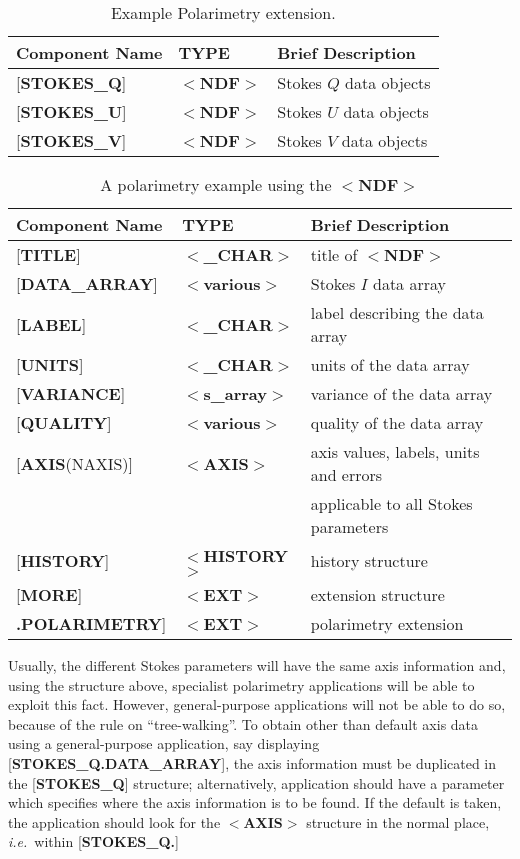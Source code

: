 \documentclass[twoside,11pt,nolof,noabs]{starlink}
\begin{document}
\begin{table}
\centering
\caption{Example Polarimetry extension.}
\begin{tabular}{|l|l|l|}
\hline
Component Name & TYPE & Brief Description \\ \hline
{[}\textbf{STOKES\_Q}{]} & $<$\textbf{NDF}$>$ & Stokes $Q$ data objects \\
{[}\textbf{STOKES\_U}{]} & $<$\textbf{NDF}$>$ & Stokes $U$ data objects \\
{[}\textbf{STOKES\_V}{]} & $<$\textbf{NDF}$>$ & Stokes $V$ data objects \\ \hline
\end{tabular}
\end{table}

\begin{table}
\centering
\caption{A polarimetry example using the $<$\textbf{NDF}$>$}
\begin{tabular}{|l|l|l|}
\hline
Component Name & TYPE & Brief Description \\ \hline
{[}\textbf{TITLE}{]} & $<$\textbf{\_CHAR}$>$ & title of $<$\textbf{NDF}$>$ \\
{[}\textbf{DATA\_ARRAY}{]} & $<$\textbf{various}$>$ & Stokes $I$ data array \\
{[}\textbf{LABEL}{]} & $<$\textbf{\_CHAR}$>$ & label describing the data array \\
{[}\textbf{UNITS}{]} & $<$\textbf{\_CHAR}$>$ & units of the data array \\
{[}\textbf{VARIANCE}{]} & $<$\textbf{s\_array}$>$ & variance of the data array \\
{[}\textbf{QUALITY}{]} & $<$\textbf{various}$>$ & quality of the data array \\
{[}\textbf{AXIS}(NAXIS){]} & $<$\textbf{AXIS}$>$ & axis values, labels, units and errors\\
& & applicable to all Stokes parameters \\
{[}\textbf{HISTORY}{]} & $<$\textbf{HISTORY}$>$ & history structure \\
{[}\textbf{MORE}{]} & $<$\textbf{EXT}$>$ & extension structure \\
\hspace{14mm}{[}\textbf{.POLARIMETRY}{]} & $<$\textbf{EXT}$>$ & polarimetry extension \\ \hline
\end{tabular}
\end{table}

Usually, the different Stokes parameters will
have the same axis information and,
using the structure above, specialist polarimetry applications will
be able to exploit this fact.  However, general-purpose applications will
not be able to do so,
because of the rule on ``tree-walking''.  To obtain
other than default
axis data using a general-purpose application, say displaying
{[}\textbf{STOKES\_Q.DATA\_ARRAY}{]}, the axis information
must be duplicated in the
{[}\textbf{STOKES\_Q}{]} structure; alternatively,
application should have
a parameter which
specifies where the axis information is to be found.
If the default is taken, the application should look
for the $<$\textbf{AXIS}$>$ structure in
the normal place, \textit{i.e.}\  within {[}\textbf{STOKES\_Q.}{]}
\end{document}
